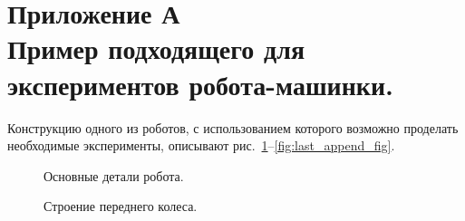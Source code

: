 \documentclass[12pt,a4paper,openany]{extarticle}
\begin{document}
\section*{Приложение А\\
Пример подходящего для экспериментов робота-машинки.}
\hspace*{\parindent}Конструкцию одного из роботов, с использованием которого возможно проделать необходимые эксперименты, описывают рис.~\ref{fig:first_append_fig}--\ref{fig:last_append_fig}.
\vspace{1cm}
\begin{figure}[h!]
	\vspace{-0.5cm}
	\caption{Основные детали робота.}
	\label{fig:first_append_fig}
\end{figure}	
\vspace{1cm}
\begin{figure}[h!]
	\caption{Строение переднего колеса.}
\end{figure}	
	
\end{document}
